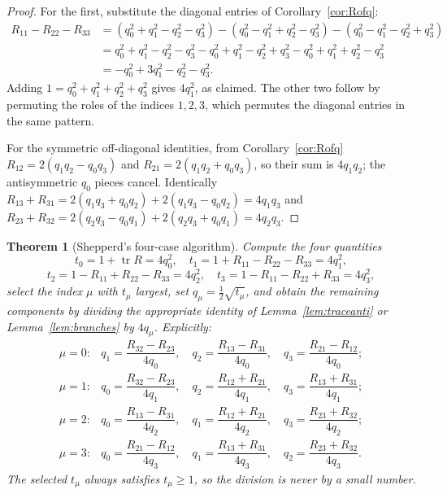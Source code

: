 \documentclass[11pt]{article}
\DeclareMathOperator{\tr}{tr}
\theoremstyle{plain}
\newtheorem{theorem}{Theorem}[section]
\theoremstyle{definition}
\begin{document}
\begin{proof}
For the first, substitute the diagonal entries of Corollary~\ref{cor:Rofq}:
\begin{align*}
R_{11}-R_{22}-R_{33}
&=(q_0^2+q_1^2-q_2^2-q_3^2)-(q_0^2-q_1^2+q_2^2-q_3^2)-(q_0^2-q_1^2-q_2^2+q_3^2)\\
&=q_0^2+q_1^2-q_2^2-q_3^2-q_0^2+q_1^2-q_2^2+q_3^2-q_0^2+q_1^2+q_2^2-q_3^2\\
&=-q_0^2+3q_1^2-q_2^2-q_3^2 .
\end{align*}
Adding $1=q_0^2+q_1^2+q_2^2+q_3^2$ gives $4q_1^2$, as claimed. The other two follow by permuting
the roles of the indices $1,2,3$, which permutes the diagonal entries in the same pattern.

For the symmetric off-diagonal identities, from Corollary~\ref{cor:Rofq}
$R_{12}=2(q_1q_2-q_0q_3)$ and $R_{21}=2(q_1q_2+q_0q_3)$, so their sum is $4q_1q_2$; the
antisymmetric $q_0$ pieces cancel. Identically $R_{13}+R_{31}=2(q_1q_3+q_0q_2)+2(q_1q_3-q_0q_2)
=4q_1q_3$ and $R_{23}+R_{32}=2(q_2q_3-q_0q_1)+2(q_2q_3+q_0q_1)=4q_2q_3$.
\end{proof}

\begin{theorem}[Shepperd's four-case algorithm]\label{thm:shepperd}
Compute the four quantities
\[
t_0=1+\tr R=4q_0^2,\quad t_1=1+R_{11}-R_{22}-R_{33}=4q_1^2,
\]
\[
t_2=1-R_{11}+R_{22}-R_{33}=4q_2^2,\quad t_3=1-R_{11}-R_{22}+R_{33}=4q_3^2 ,
\]
select the index $\mu$ with $t_\mu$ largest, set $q_\mu=\tfrac12\sqrt{t_\mu}$, and obtain the
remaining components by dividing the appropriate identity of Lemma~\ref{lem:traceanti} or
Lemma~\ref{lem:branches} by $4q_\mu$. Explicitly:
\[
\begin{array}{ll}
\mu=0: & q_1=\dfrac{R_{32}-R_{23}}{4q_0},\quad q_2=\dfrac{R_{13}-R_{31}}{4q_0},\quad q_3=\dfrac{R_{21}-R_{12}}{4q_0};\\[10pt]
\mu=1: & q_0=\dfrac{R_{32}-R_{23}}{4q_1},\quad q_2=\dfrac{R_{12}+R_{21}}{4q_1},\quad q_3=\dfrac{R_{13}+R_{31}}{4q_1};\\[10pt]
\mu=2: & q_0=\dfrac{R_{13}-R_{31}}{4q_2},\quad q_1=\dfrac{R_{12}+R_{21}}{4q_2},\quad q_3=\dfrac{R_{23}+R_{32}}{4q_2};\\[10pt]
\mu=3: & q_0=\dfrac{R_{21}-R_{12}}{4q_3},\quad q_1=\dfrac{R_{13}+R_{31}}{4q_3},\quad q_2=\dfrac{R_{23}+R_{32}}{4q_3}.
\end{array}
\]
The selected $t_\mu$ always satisfies $t_\mu\ge1$, so the division is never by a small number.
\end{theorem}
\end{document}
